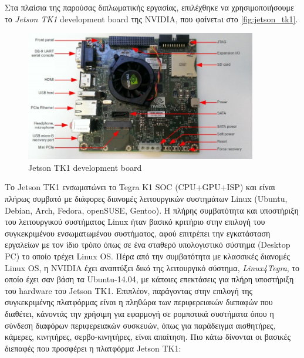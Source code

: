 Στα πλαίσια της παρούσας διπλωματικής εργασίας, επιλέχθηκε να χρησιμοποιήσουμε το
\emph{Jetson TK1} development board της NVIDIA, που φαίνετaι στο \autoref{fig:jetson_tk1}.
\begin{figure}[!ht]
  \centering
  \includegraphics[width=0.9\textwidth]{./images/chapter4/jetson-tk1-labelled.jpg}
  \caption[Jetson TK1 development board]{Jetson TK1 development board}
  \label{fig:jetson_tk1}
\end{figure}
Το Jetson TK1 ενσωματώνει το Tegra K1 SOC (CPU+GPU+ISP)
και είναι πλήρως συμβατό με διάφορες διανομές λειτουργικών συστημάτων Linux (Ubuntu, Debian, Arch, Fedora, openSUSE, Gentoo).
Η πλήρης συμβατότητα και υποστήριξη του λειτουργικού συστήματος Linux ήταν βασικό κριτήριο
στην επιλογή του συγκεκριμένου ενσωματωμένου συστήματος, αφού επιτρέπει την
εγκατάσταση εργαλείων με τον ίδιο τρόπο όπως σε ένα σταθερό υπολογιστικό σύστημα (Desktop PC)
το οποίο τρέχει Linux OS. Πέρα από την συμβατότητα με κλασσικές διανομές Linux OS,
η NVIDIA έχει αναπτύξει δικό της λειτουργικό σύστημα, \emph{Linux4Tegra}, το οποίο
έχει σαν βάση τα Ubuntu-14.04, με κάποιες επεκτάσεις για πλήρη υποστήριξη του hardware του Jetson TK1.
Επιπλέον, παράγοντας στην επιλογή της συγκεκριμένης πλατφόρμας είναι η πληθώρα των περιφερειακών διεπαφών που
διαθέτει, κάνοντάς την χρήσιμη για εφαρμογή σε ρομποτικά συστήματα όπου η σύνδεση διαφόρων περιφερειακών συσκευών,
όπως για παράδειγμα αισθητήρες, κάμερες, κινητήρες, σερβο-κινητήρες, είναι απαίτηση.
Πιο κάτω δίνονται οι βασικές διεπαφές που προσφέρει η πλατφόρμα Jetson TK1:
